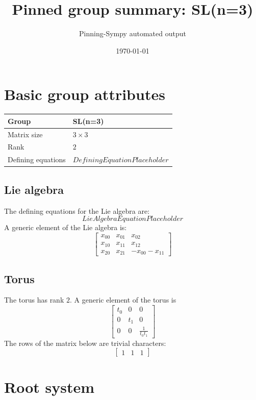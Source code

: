 \documentclass[11pt]{article}
\title{Pinned group summary: SL(n=3)}
\author{Pinning-Sympy automated output}
\date{\today}
\theoremstyle{definition}
\begin{document}
\maketitle
\tableofcontents

\newpage

\section{Basic group attributes}

\begin{tabular}{|l|l|}
	\hline
    Group & SL(n=3) \\
	\hline
    Matrix size & $3 \times 3$ \\
	\hline
    Rank & $2$ \\
	\hline
	Defining equations & $DefiningEquationPlaceholder$ \\
	\hline
\end{tabular}



\subsection{Lie algebra}

The defining equations for the Lie algebra are:
\[
LieAlgebraEquationPlaceholder
\]
A generic element of the Lie algebra is:
\[
\left[\begin{matrix}x_{0 0} & x_{0 1} & x_{0 2}\\x_{1 0} & x_{1 1} & x_{1 2}\\x_{2 0} & x_{2 1} & - x_{0 0} - x_{1 1}\end{matrix}\right]
\]

\subsection{Torus}

The torus has rank $2$. A generic element of the torus is
\[
\left[\begin{matrix}t_{0} & 0 & 0\\0 & t_{1} & 0\\0 & 0 & \frac{1}{t_{0} t_{1}}\end{matrix}\right]
\]
The rows of the matrix below are trivial characters:
\[
\left[\begin{matrix}1 & 1 & 1\end{matrix}\right]
\]

\newpage
\section{Root system}
\end{document}
